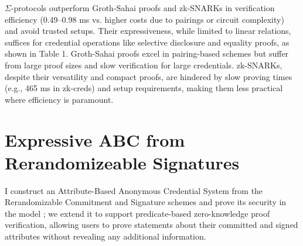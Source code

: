 $\Sigma$-protocols outperform Groth-Sahai proofs and zk-SNARKs in verification efficiency (0.49–0.98 ms vs. higher costs due to pairings or circuit complexity) and avoid trusted setups. Their expressiveness, while limited to linear relations, suffices for credential operations like selective disclosure and equality proofs, as shown in Table 1. Groth-Sahai proofs excel in pairing-based schemes but suffer from large proof sizes and slow verification for large credentials. zk-SNARKs, despite their versatility and compact proofs, are hindered by slow proving times (e.g., 465 ms in zk-creds) and setup requirements, making them less practical where efficiency is paramount.











\section{Expressive ABC from Rerandomizeable Signatures}\label{sec:abc}

I construct an Attribute-Based Anonymous Credential System from the Rerandomizable Commitment and Signature schemes and prove its security in the model \cite{fuchsbauer_structure-preserving_2019}; we extend it to support predicate-based zero-knowledge proof verification, allowing users to prove statements about their committed and signed attributes without revealing any additional information.


